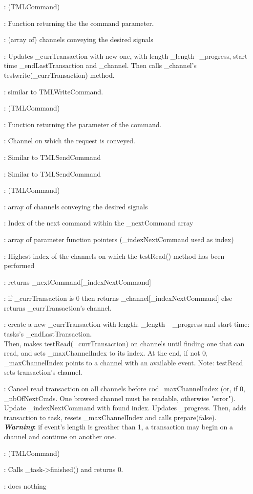 \documentclass[a4paper,11pt]{article}
\newcommand{\bfont}{\fontseries{b}\selectfont}
\newcommand{\cod}[1]{{\ttfamily #1}}
\newcommand{\class}[2]{\par\vspace{1mm}\hspace{-5mm}\large\colorbox{file}{\textbullet\bfont\cod{#1}:} (\cod{#2})\par}
\newcommand{\method}[1]{\par\vspace{1mm}\hspace{-2mm}\colorbox{method}{\textopenbullet\bfont\cod{#1}:}}
\newcommand{\variable}[1]{\par\vspace{1mm}\hspace{-2mm}\colorbox{variable}{\textopenbullet\bfont\cod{#1}:}}
\begin{document}
\class{TMLSendCommand}{TMLCommand}
\variable{\_paramFunc} Function returning the the command parameter.
\variable{\_channel}  (array of) channels conveying the desired signals
\method{prepareNextTransaction()} Updates \cod{\_currTransaction} with new one, with length \cod{\_length}$-$\cod{\_progress}, start time \cod{\_endLastTransaction} and \cod{\_channel}. Then calls \cod{\_chan\-nel}'s \cod{testwrite(\_currTransaction)} method.
\method{execute()} similar to \cod{TMLWriteCommand}.

\class{TMLRequestCommand}{TMLCommand}
\variable{\_paramFunc} Function returning the parameter of the command.
\variable{\_channel} Channel on which the request is conveyed.
\method{prepareNextTransaction()} Similar to \cod{TMLSendCommand}
\method{execute()} Similar to \cod{TMLSendCommand}

\class{TMLSelectCommand}{TMLCommand}
\variable{\_channel} array of channels conveying the desired signals
\variable{\_indexNextCommand} Index of the next command within the \cod{\_nextCommand} array
\variable{\_paramFuncs} array of parameter function pointers (\cod{\_indexNextCommand} used as index)
\variable{\_maxChannelIndex} Highest index of the channels on which the \cod{testRead()} method has been performed

\method{getNextCommand()} returns \cod{\_nextCommand[\_indexNextCommand]}
\method{getChannel(iIndex)}  if \cod{\_currTransaction} is 0 then returns \cod{\_channel[\_indexNext\-Command]} else returns \cod{\_currTransaction}'s channel.
\method{prepareNextTransaction()} create a new \cod{\_currTransaction} with length: \cod{\_length}$-$ \cod{\_progress} and start time: tasks's \cod{\_endLastTransaction}.\\ Then, makes \cod{testRead(\_currTransaction}) on channels until finding one that can read, and sets \cod{\_maxChannelIndex} to its index. At the end, if not 0, \cod{\_maxChannelIndex} points to a channel with an available event. Note: \cod{testRead} sets transaction's channel.
\method{execute()} Cancel read transaction on all channels before cod{\_maxChannelIndex} (or, if 0, \cod{\_nbOfNextCmds}. One browsed channel must be readable, otherwise "error"). Update \cod{\_indexNextCommand} with found index. Updates \cod{\_progress}. Then, adds transaction to task, resets \cod{\_maxChannelIndex} and calls \cod{prepare(false)}. {\bf\textit{Warning}:} if event's length is greather than 1, a transaction may begin on a channel and continue on another one.
\class{TMLStopCommand}{TMLCommand}
\method{prepareNextTransaction()} Calls \cod{\_task->finished()} and returns 0.
\method{execute()} does nothing
\end{document}
